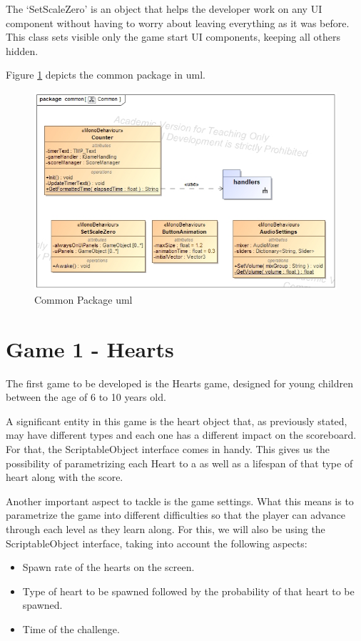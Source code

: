 The `SetScaleZero' is an object that helps the developer work on any UI component without having to worry about leaving everything as it was before. This class sets visible only the game start UI components, keeping all others hidden.

Figure \ref{fig:common-classes} depicts the common package in \gls{uml}.
\begin{figure}[H]
    \centering
    \includegraphics[width=0.8\linewidth]{Chapters/new_architechture/class__common__Common.jpg}
    \caption{Common Package \gls{uml}}
    \label{fig:common-classes}
\end{figure}

\section{Game 1 - Hearts}
\label{arqHearts}

The first game to be developed is the Hearts game, designed for young children between the age of 6 to 10 years old.

A significant entity in this game is the heart object that, as previously stated, may have different types and each one has a different impact on the scoreboard. For that, the ScriptableObject interface \cite{unityDocScriptableObj} comes in handy. This gives us the possibility of parametrizing each Heart to a  as well as a lifespan of that type of heart along with the score.

Another important aspect to tackle is the game settings. What this means is to parametrize the game into different difficulties so that the player can advance through each level as they learn along.
For this, we will also be using the ScriptableObject interface, taking into account the following aspects:

\begin{itemize}[noitemsep, topsep=5pt, parsep=5pt, partopsep=5pt]
    \item Spawn rate of the hearts on the screen.
    \item Type of heart to be spawned followed by the probability of that heart to be spawned.
    \item Time of the challenge.
\end{itemize}

